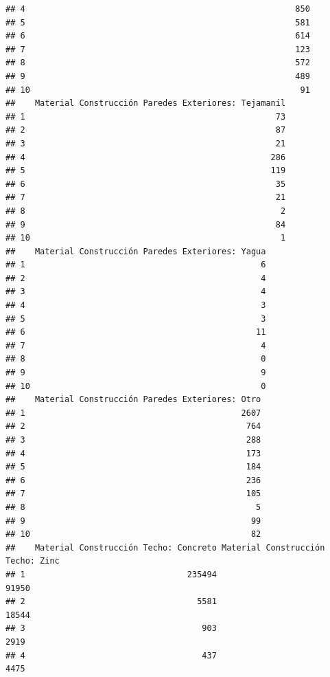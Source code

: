 \documentclass[11pt,]{article}
\begin{document}
\begin{verbatim}
## 4                                                       850
## 5                                                       581
## 6                                                       614
## 7                                                       123
## 8                                                       572
## 9                                                       489
## 10                                                       91
##    Material Construcción Paredes Exteriores: Tejamanil
## 1                                                   73
## 2                                                   87
## 3                                                   21
## 4                                                  286
## 5                                                  119
## 6                                                   35
## 7                                                   21
## 8                                                    2
## 9                                                   84
## 10                                                   1
##    Material Construcción Paredes Exteriores: Yagua
## 1                                                6
## 2                                                4
## 3                                                4
## 4                                                3
## 5                                                3
## 6                                               11
## 7                                                4
## 8                                                0
## 9                                                9
## 10                                               0
##    Material Construcción Paredes Exteriores: Otro
## 1                                            2607
## 2                                             764
## 3                                             288
## 4                                             173
## 5                                             184
## 6                                             236
## 7                                             105
## 8                                               5
## 9                                              99
## 10                                             82
##    Material Construcción Techo: Concreto Material Construcción Techo: Zinc
## 1                                 235494                             91950
## 2                                   5581                             18544
## 3                                    903                              2919
## 4                                    437                              4475

\end{verbatim}
\end{document}
